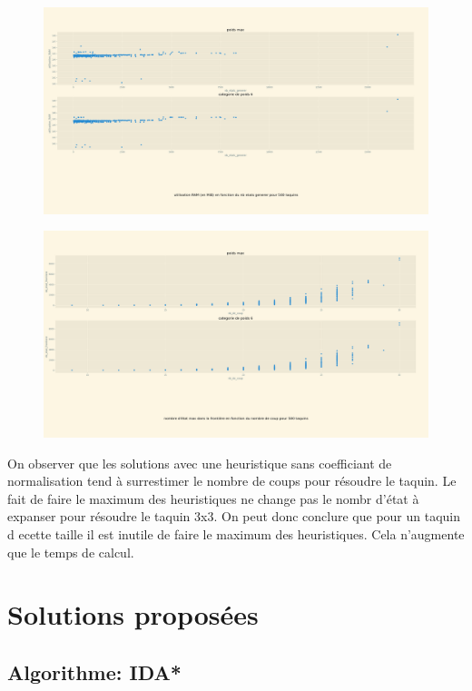 \documentclass[a4paper, 12pt]{article}
\begin{document}
\begin{figure}[H]
    \centering
    \includegraphics[width=\textwidth]{Taquin 3x3 utilisation RAM en fct du nb d'etat generer}
\end{figure}

\begin{figure}[H]
    \centering
    \includegraphics[width=\textwidth]{Taquin 3xnb etat dans la frontiere en fct du nb de coups}
\end{figure}

On observer que les solutions avec une heuristique sans coefficiant de normalisation tend à surrestimer le nombre de coups pour résoudre le taquin.  Le fait de faire le maximum des heuristiques ne change pas le nombr d'état à expanser pour résoudre le taquin 3x3. On peut donc conclure que pour un taquin d ecette taille il est inutile de faire le maximum des heuristiques. Cela n'augmente que le temps de calcul.

\section{Solutions proposées}

\subsection{Algorithme: IDA*}
\end{document}
